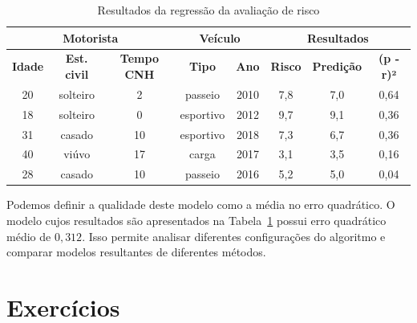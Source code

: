 \begin{table}[h]
	\centering
	
	\begin{tabular}{ccc|cc|ccc}
		\hline
		         \multicolumn{3}{c|}{\textbf{Motorista}}           & \multicolumn{2}{c|}{\textbf{Veículo}} &        \multicolumn{3}{c}{\textbf{Resultados}}        \\ \hline
		\textbf{Idade} & \textbf{Est. civil} & \textbf{Tempo CNH} & \textbf{Tipo} &     \textbf{Ano}      & \textbf{Risco} & \textbf{Predição} & \textbf{(p - r)²} \\ \hline
		      20       &      solteiro       &         2          &    passeio    &         2010          &      7,8       &        7,0        &       0,64        \\
		      18       &      solteiro       &         0          &   esportivo   &         2012          &      9,7       &        9,1        &       0,36        \\
		      31       &       casado        &         10         &   esportivo   &         2018          &      7,3       &        6,7        &       0,36        \\
		      40       &        viúvo        &         17         &     carga     &         2017          &      3,1       &        3,5        &       0,16        \\
		      28       &       casado        &         10         &    passeio    &         2016          &      5,2       &        5,0        &       0,04        \\ \hline
	\end{tabular}
	
	\caption{Resultados da regressão da avaliação de risco}
	\label{tab:resultados-regressao}
\end{table}

Podemos definir a qualidade deste modelo como a média no erro quadrático. O modelo cujos resultados são apresentados na Tabela~\ref{tab:resultados-regressao} possui erro quadrático médio de $0,312$. Isso permite analisar diferentes configurações do algoritmo e comparar modelos resultantes de diferentes métodos.

\clearpage

\section{Exercícios}

\resetexercisenumbering

